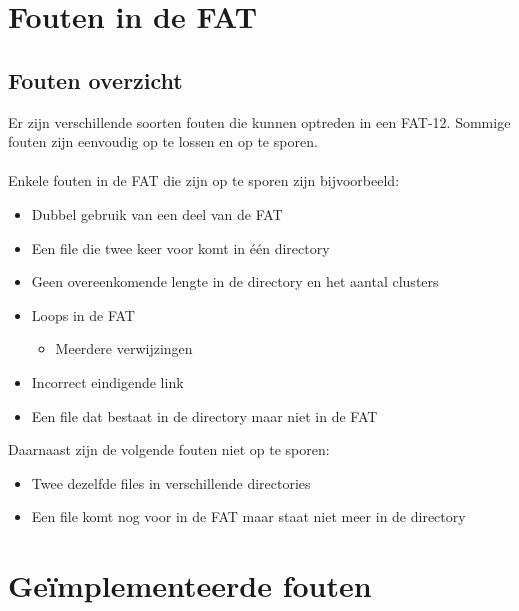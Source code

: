 \documentclass[11pt]{article}
\begin{document}
	\newpage

	\section{Fouten in de FAT}\label{sec:fout}
	\subsection{Fouten overzicht}\label{sec:overzicht}
	Er zijn verschillende soorten fouten die kunnen optreden in een FAT-12. Sommige fouten zijn eenvoudig op te lossen en op te sporen.\\\\
	Enkele fouten in de FAT die zijn op te sporen zijn bijvoorbeeld:
	\begin{itemize}
		\item Dubbel gebruik van een deel van de FAT
		\item Een file die twee keer voor komt in \'e\'en directory
		\item Geen overeenkomende lengte in de directory en het aantal clusters
		\item Loops in de FAT
		\begin{itemize}
			\item Meerdere verwijzingen 
		\end{itemize}
		\item Incorrect eindigende link
		\item Een file dat bestaat in de directory maar niet in de FAT
	\end{itemize}
	Daarnaast zijn de volgende fouten niet op te sporen:
	\begin{itemize}
		\item Twee dezelfde files in verschillende directories
		\item Een file komt nog voor in de FAT maar staat niet meer in de directory
	\end{itemize}

	\newpage

	\section{Ge\"implementeerde fouten}\label{sec:impfout}
\end{document}
